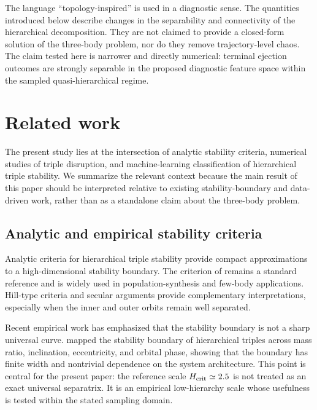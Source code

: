 \documentclass[12pt,a4paper]{article}
\newcommand{\Hcrit}{H_{\rm crit}}
\begin{document}
The language ``topology-inspired'' is used in a diagnostic sense. The quantities introduced below describe changes in the separability and connectivity of the hierarchical decomposition. They are not claimed to provide a closed-form solution of the three-body problem, nor do they remove trajectory-level chaos. The claim tested here is narrower and directly numerical: terminal ejection outcomes are strongly separable in the proposed diagnostic feature space within the sampled quasi-hierarchical regime.

\section{Related work}
\label{sec:related_work}

The present study lies at the intersection of analytic stability criteria, numerical studies of triple disruption, and machine-learning classification of hierarchical triple stability. We summarize the relevant context because the main result of this paper should be interpreted relative to existing stability-boundary and data-driven work, rather than as a standalone claim about the three-body problem.

\subsection{Analytic and empirical stability criteria}
\label{sec:related_analytic}

Analytic criteria for hierarchical triple stability provide compact approximations to a high-dimensional stability boundary. The criterion of \citet{Mardling2001} remains a standard reference and is widely used in population-synthesis and few-body applications. Hill-type criteria and secular arguments provide complementary interpretations, especially when the inner and outer orbits remain well separated.

Recent empirical work has emphasized that the stability boundary is not a sharp universal curve. \citet{Tory2022} mapped the stability boundary of hierarchical triples across mass ratio, inclination, eccentricity, and orbital phase, showing that the boundary has finite width and nontrivial dependence on the system architecture. This point is central for the present paper: the reference scale \(\Hcrit\simeq2.5\) is not treated as an exact universal separatrix. It is an empirical low-hierarchy scale whose usefulness is tested within the stated sampling domain.
\end{document}
